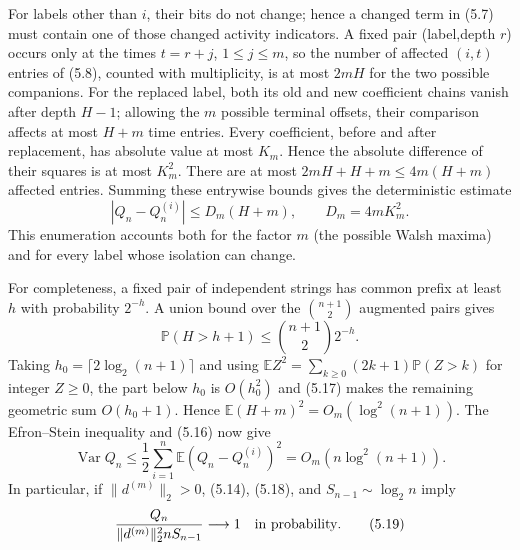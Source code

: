 \documentclass[11pt]{article}
\numberwithin{equation}{section}
\newcommand{\E}{\mathbb E}\newcommand{\Pp}{\mathbb P}
\newcommand{\Var}{\operatorname{Var}}\newcommand{\Cov}{\operatorname{Cov}}
\newcommand{\1}{\mathbf 1}\newcommand{\F}{\mathcal F}\newcommand{\D}{\mathcal D}
\begin{document}
For labels other than $i$, their bits do not change; hence a changed term in
(5.7) must contain one of those changed activity indicators.  A fixed pair
(label,depth $r$) occurs only at the times $t=r+j$, $1\le j\le m$, so the
number of affected $(i,t)$ entries of (5.8), counted with multiplicity, is
at most $2mH$ for the two possible companions.  For the replaced label,
both its old and new coefficient chains vanish after depth $H-1$; allowing
the $m$ possible terminal offsets, their comparison affects at most
$H+m$ time entries.  Every coefficient, before and after replacement, has absolute value at most
$K_m$.  Hence the absolute difference of their squares is at most $K_m^2$.
There are at most $2mH+H+m\le4m(H+m)$ affected entries.  Summing these
entrywise bounds gives the deterministic estimate
\begin{equation}
 |Q_n-Q_n^{(i)}|\le D_m(H+m),\qquad D_m=4mK_m^2.             \tag{5.16}
\end{equation}
This enumeration accounts both for the factor $m$ (the possible Walsh
maxima) and for every label whose isolation can change.

For completeness, a fixed pair of independent strings has common prefix at
least $h$ with probability $2^{-h}$.  A union bound over the
$\binom{n+1}{2}$ augmented pairs gives
\begin{equation}
 \Pp(H>h+1)\le\binom{n+1}{2}2^{-h}.                           \tag{5.17}
\end{equation}
Taking $h_0=\lceil2\log_2(n+1)\rceil$ and using
$\E Z^2=\sum_{k\ge0}(2k+1)\Pp(Z>k)$ for integer $Z\ge0$, the part below
$h_0$ is $O(h_0^2)$ and (5.17) makes the remaining geometric sum
$O(h_0+1)$.  Hence $\E(H+m)^2=O_m(\log^2(n+1))$.  The
Efron--Stein inequality and (5.16) now give
\begin{equation}
 \Var Q_n\le\frac12\sum_{i=1}^n\E(Q_n-Q_n^{(i)})^2
             =O_m(n\log^2(n+1)).                             \tag{5.18}
\end{equation}
In particular, if $\|d^{(m)}\|_2>0$, (5.14), (5.18), and
$S_{n-1}\sim\log_2n$ imply
\begin{equation}
 {Q_n\over \|d^{(m)}\|_2^2nS_{n-1}}\longrightarrow1
 \quad\hbox{in probability}.                                \tag{5.19}
\end{equation}
\end{document}
